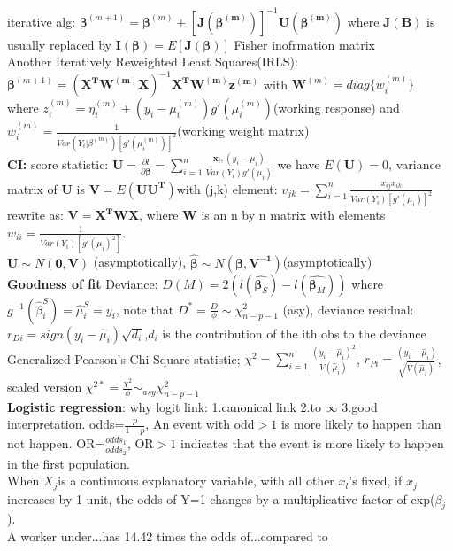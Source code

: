 \documentclass[10pt,a4paper,landscape]{article}
\begin{document}
\begin{multicols}{3}
{   iterative alg: $\boldsymbol{\beta}^{(m+1)}=\boldsymbol{\beta}^{(m)}+[\boldsymbol{J(\beta^{(m)})}]^{-1}\boldsymbol{U(\beta^{(m)})}$ where $\boldsymbol{J(B)}$ is usually replaced by $\boldsymbol{I(\beta)}=E[\boldsymbol{J(\beta)}]$ Fisher inofrmation matrix\\
   Another Iteratively Reweighted Least Squares(IRLS):
   $\boldsymbol{\beta}^{(m+1)}=(\boldsymbol{X^TW^{(m)}X})^{-1}\boldsymbol{X^TW^{(m)}z^{(m)}} $ with $\boldsymbol{W}^{(m)}=diag\{w_i^{(m)} \}$\\
   where $z_i^{(m)}=\eta_i^{(m)}+(y_i-\mu_i^{(m)})g'(\mu_i^{(m)})$(working response) and $w_i^{(m)}=\frac{1}{Var(Y_i|\beta^{(m)})[g'(\mu_i^{(m)})]^2} $(working weight matrix)\\
   \textbf{CI:} score statistic: $\boldsymbol{U}=\frac{\partial l}{\partial \boldsymbol{\beta}} =\sum_{i=1}^n \frac{\boldsymbol{x}_i, (y_i-\mu_i)}{Var(Y_i)g'(\mu_i)} $  we have $E(\boldsymbol{U})=0$, variance matrix of $\boldsymbol{U}$ is $\boldsymbol{V}=E(\boldsymbol{UU^T})$with (j,k) element: $v_{jk}=\sum_{i=1}^n \frac{x_{ij}x_{ik}}{Var(Y_i)[g'(\mu_i)]^2} $ rewrite as: $\boldsymbol{V}=\boldsymbol{X^TWX}$, where $\boldsymbol{W}$ is an n by n matrix with elements $w_{ii}=\frac{1}{Var(Y_i)[g'(\mu_i)^2]}$.\\
   $\boldsymbol{U}\sim N(\boldsymbol{0,V})$ (asymptotically), $\boldsymbol{\hat{\beta}}\sim N(\boldsymbol{\beta, V^{-1}})$(asymptotically)\\
   
   
   
   \textbf{Goodness of fit}
   Deviance: $D(M)=2(l(\hat{\boldsymbol{\beta}_S})-l(\hat{\boldsymbol{\beta}_M} ))$ where $g^{-1}(\hat{\beta}^S_i)=\hat{\mu}_i^S=y_i $, note that $D^*=\frac{D}{\phi} \sim \chi^2_{n-p-1}$ (asy), deviance residual: $r_{Di}=sign(y_i-\hat{\mu}_i)\sqrt{d_i}$,$d_i$ is the contribution of the ith obs to the deviance\\
   Generalized Pearson's Chi-Square statistic; $\chi^2=\sum_{i=1}^n\frac{(y_i-\hat{\mu}_i)^2}{V(\hat{\mu}_i)} $, $r_{Pi}=\frac{(y_i-\hat{\mu}_i)}{\sqrt{V(\hat{\mu}_i)}}$, scaled version $\chi^{2*}=\frac{\chi^2}{\phi}\sim_{asy}\chi^2_{n-p-1} $\\
   \textbf{Logistic regression}: why logit link: 1.canonical link 2.to $\infty$ 3.good interpretation.
   odds=$\frac{p}{1-p}$, An event with odd$>1$ is more likely to happen than not happen. OR=$\frac{odds_1}{odds_2}$, OR$>1$ indicates that the event is more likely to happen in the first population.\\
   When $X_j$is a continuous explanatory variable, with all other $x_l$'s fixed, if $x_j$ increases by 1 unit, the odds of Y=1 changes by a multiplicative factor of exp($\beta_j$).\\
   A worker under...has 14.42 times the odds of...compared to
   
   
   
   

}  
  





\end{multicols}
\end{document}
